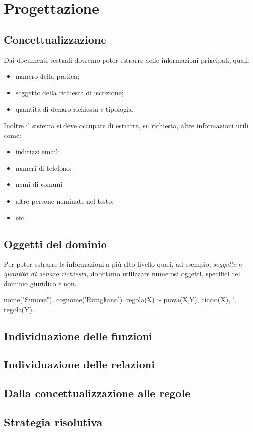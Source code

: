 \section{Progettazione}

\subsection{Concettualizzazione}
Dai documenti testuali dovremo poter estrarre delle informazioni principali, quali:
\begin{itemize}
\item numero della pratica; %
\item soggetto della richiesta di iscrizione;
\item quantità di denaro richiesta e tipologia.
\end{itemize}

Inoltre il sistema si deve occupare di estrarre, su richiesta, altre informazioni utili come:
\begin{itemize}
\item indirizzi email;
\item numeri di telefono;
\item nomi di comuni;
\item altre persone nominate nel testo;
\item etc.
\end{itemize}

\subsection{Oggetti del dominio}
Per poter estrarre le informazioni a più alto livello quali, ad esempio, \emph{soggetto} e \emph{quantità di denaro richiesta}, dobbiamo utilizzare numerosi oggetti, specifici del dominio giuridico e non.

\begin{prologcode}
nome("Simone").
cognome('Rutigliano').
regola(X) :- 
	prova(X,Y),
	ciccio(X),
	!,
	regola(Y).
\end{prologcode}


\subsection{Individuazione delle funzioni}

\subsection{Individuazione delle relazioni}

\subsection{Dalla concettualizzazione alle regole}

\subsection{Strategia risolutiva}